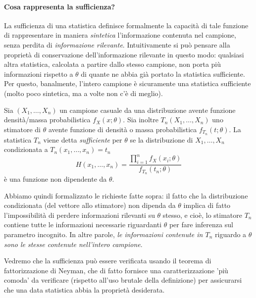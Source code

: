 \paragraph{Cosa rappresenta la sufficienza?}
La sufficienza di una statistica definisce formalmente la capacità di tale funzione di rappresentare in maniera \emph{sintetica} l'informazione contenuta nel campione, senza perdita di \emph{informazione rilevante}.
Intuitivamente si può pensare alla proprietà di conservazione dell'informazione rilevante in questo modo: qualsiasi altra statistica, calcolata a partire dallo stesso campione, non porta più informazioni rispetto a \(\theta\) di quante ne abbia già portato la statistica sufficiente.
Per questo, banalmente, l'intero campione è sicuramente una statistica sufficiente (molto poco sintetica, ma a volte non c'è di meglio).

\begin{dfn}[Sufficienza]
  Sia \((X_1,\dotsc,X_n)\) un campione casuale da una distribuzione avente funzione densità/massa probabilistica \(f_X(x;\theta)\). Sia inoltre \(T_n(X_1,\dotsc,X_n)\) uno stimatore di \(\theta\) avente funzione di densità o massa probabilistica \(f_{T_n}(t; \theta)\).
  La statistica \(T_n\) viene detta \emph{sufficiente} per \(\theta\) se la distribuzione di \(X_1,\dotsc,X_n\) condizionata a \(T_n(x_1,\dotsc,x_n) = t_n\)
  \begin{equation*}
    H(x_1,\dotsc,x_n) = \frac{\prod_{i=1}^n f_{X}(x_i;\theta)}{f_{T_n}(t_n;\theta)}
  \end{equation*}
  è una funzione non dipendente da \(\theta\).
\end{dfn}

Abbiamo quindi formalizzato le richieste fatte sopra: il fatto che la distribuzione condizionata (del vettore allo stimatore) non dipenda da \(\theta\) implica di fatto l'impossibilità di perdere informazioni rilevanti su \(\theta\) stesso, e cioè, lo stimatore \(T_n\) contiene tutte le informazioni necessarie riguardanti \(\theta\) per fare inferenza sul parametro incognito.
In altre parole, \textit{le informazioni contenute in \(T_n\)} riguardo a \(\theta\) \textit{sono le stesse contenute nell'intero campione}.

Vedremo che la sufficienza può essere verificata usando il teorema di fattorizzazione di Neyman, che di fatto fornisce una caratterizzazione 'più comoda' da verificare (rispetto all'uso brutale della definizione) per assicurarsi che una data statistica abbia la proprietà desiderata.

